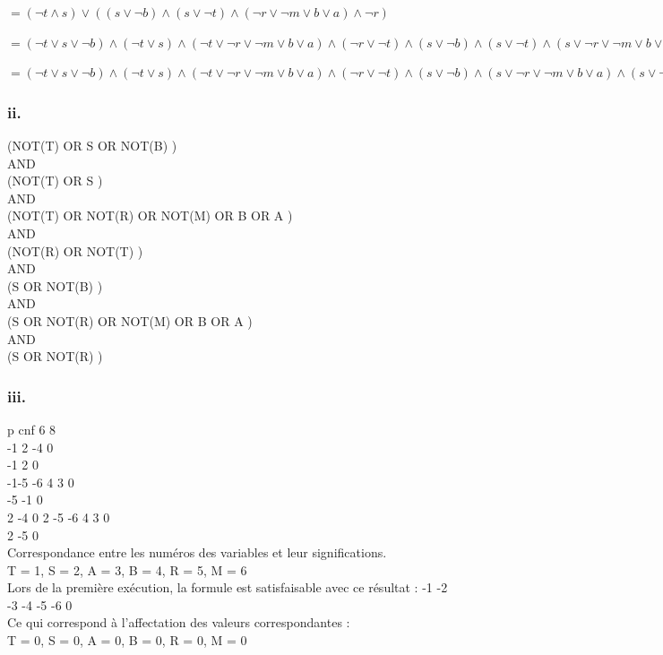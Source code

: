 \documentclass[12pt]{report}
\begin{document}
$= (\lnot t \land s) \lor ((s \lor \lnot b) \land (s\lor \lnot t) \land (\lnot r \lor \lnot m \lor b \lor a) \land \lnot r)$

$= (\lnot t \lor s \lor \lnot b) \land (\lnot t \lor s) \land (\lnot t \lor \lnot r \lor \lnot m \lor b \lor a) \land (\lnot r \lor \lnot t) \land (s \lor \lnot b) \land (s \lor \lnot t) \land (s \lor \lnot r \lor \lnot m \lor b \lor a) \land (\lnot r \lor s)$

$= (\lnot t \lor s \lor \lnot b) \land (\lnot t \lor s) \land (\lnot t \lor \lnot r \lor \lnot m \lor b \lor a) \land (\lnot r \lor \lnot t) \land (s \lor \lnot b) \land (s \lor \lnot r \lor \lnot m \lor b \lor a) \land (s \lor \lnot r)$

\subsubsection*{ii.}
(NOT(T) OR S OR NOT(B) ) \\
AND \\
(NOT(T) OR S ) \\
AND \\
(NOT(T) OR NOT(R) OR NOT(M) OR B OR A ) \\
AND \\
(NOT(R) OR NOT(T) ) \\
AND \\
(S OR NOT(B) ) \\
AND \\
(S OR NOT(R) OR NOT(M) OR B OR A ) \\
AND \\
(S OR NOT(R) )

\subsubsection*{iii.}
p cnf 6 8\\
-1 2 -4 0\\
-1 2 0\\
-1-5 -6 4 3 0\\
-5 -1 0\\
2 -4 0
2 -5 -6 4 3 0\\
2 -5 0\\

\noindent Correspondance entre les numéros des variables et leur significations. \\
T = 1, S = 2, A = 3, B = 4, R = 5, M = 6 \\
Lors de la première exécution, la formule est satisfaisable avec ce résultat : -1 -2 -3 -4 -5 -6 0 \\
Ce qui correspond à l'affectation des valeurs correspondantes : \\
T = 0, S = 0, A = 0, B = 0, R = 0, M = 0 \\
\end{document}
